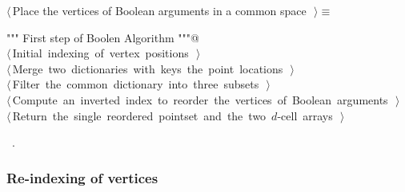 \documentclass[11pt,oneside]{article}	%
\begin{document}
\begin{flushleft} \small \label{scrap2}
$\langle\,$Place the vertices of Boolean arguments in a common space\nobreak\ {\footnotesize {}}$\,\rangle\equiv$
\vspace{-1ex}
\begin{list}{}{} \item
\mbox{}\verb@""" First step of Boolen Algorithm """@\\
\mbox{}\verb@@\hbox{$\langle\,$Initial indexing of vertex positions\nobreak\ {\footnotesize {}}$\,\rangle$}\verb@@\\
\mbox{}\verb@@\hbox{$\langle\,$Merge two dictionaries with keys the point locations\nobreak\ {\footnotesize {}}$\,\rangle$}\verb@@\\
\mbox{}\verb@@\hbox{$\langle\,$Filter the common dictionary into three subsets\nobreak\ {\footnotesize {}}$\,\rangle$}\verb@@\\
\mbox{}\verb@@\hbox{$\langle\,$Compute an inverted index to reorder the vertices of Boolean arguments\nobreak\ {\footnotesize {}}$\,\rangle$}\verb@@\\
\mbox{}\verb@@\hbox{$\langle\,$Return the single reordered pointset and the two $d$-cell arrays\nobreak\ {\footnotesize {}}$\,\rangle$}\verb@@\\
\mbox{}\verb@@{\NWsep}
\end{list}
\vspace{-1ex}
\footnotesize\addtolength{\baselineskip}{-1ex}
\begin{list}{}{\setlength{\itemsep}{-\parsep}\setlength{\itemindent}{-\leftmargin}}
\item \NWtxtMacroRefIn\ .
\end{list}
\end{flushleft}

\subsubsection{Re-indexing of vertices}
\end{document}
